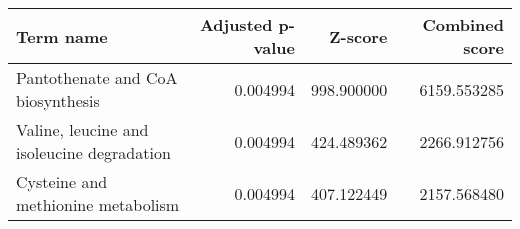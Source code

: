 \begin{tabular}{lrrr}
\toprule
                                 Term name &  Adjusted p-value &    Z-score &  Combined score \\
\midrule
         Pantothenate and CoA biosynthesis &          0.004994 & 998.900000 &     6159.553285 \\
Valine, leucine and isoleucine degradation &          0.004994 & 424.489362 &     2266.912756 \\
        Cysteine and methionine metabolism &          0.004994 & 407.122449 &     2157.568480 \\
\bottomrule
\end{tabular}
